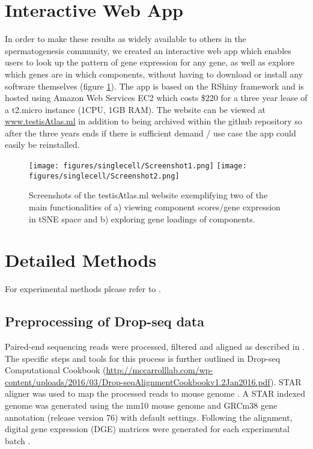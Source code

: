 \section{Interactive Web App}
In order to make these results as widely available to others in the spermatogenesis community, we created an interactive web app which enables users to look up the pattern of gene expression for any gene, as well as explore which genes are in which components, without having to download or install any software themselves (figure \ref{fig:shiny}). The app is based on the RShiny framework and is hosted using Amazon Web Services EC2 which costs \$220 for a three year lease of a t2.micro instance (1CPU, 1GB RAM). The website can be viewed at \url{www.testisAtlas.ml} in addition to being archived within the github repository so after the three years ends if there is sufficient demand / use case the app could easily be reinstalled.

\begin{figure}[H]
	\centering
	\texttt{[image: figures/singlecell/Screenshot1.png]}
	\texttt{[image: figures/singlecell/Screenshot2.png]}
	\caption[Interactive Web Application]{
		Screenshots of the testisAtlas.ml website exemplifying two of the main functionalities of a) viewing component scores/gene expression in tSNE space and b) exploring gene loadings of components.
	}
	\label{fig:shiny}
\end{figure}


\section{Detailed Methods}
For experimental methods please refer to \cite{Jung2019Unified}.

\subsection{Preprocessing of Drop-seq data}

Paired-end sequencing reads were processed, filtered and aligned as described in \cite{Macosko2015Highly}. The specific steps and tools for this process is further outlined in Drop-seq Computational Cookbook (\url{http://mccarrolllab.com/wp-content/uploads/2016/03/Drop-seqAlignmentCookbookv1.2Jan2016.pdf}). STAR aligner was used to map the processed reads to mouse genome \parencite{Dobin2013STAR}. A STAR indexed genome was generated using the mm10 mouse genome and GRCm38 gene annotation (release version 76) with default settings. Following the alignment, digital gene expression (DGE) matrices were generated for each experimental batch \parencite{Macosko2015Highly}.

